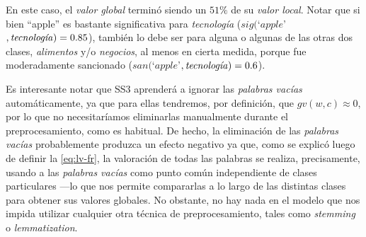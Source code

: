 \begin{itemize}
{        \vspace{5mm}

        En este caso, el \emph{valor global} terminó siendo un $51\%$ de su \emph{valor local}.
        Notar que si bien ``apple'' es bastante significativa para \emph{tecnología} ($sig($`$apple$'$, \text{\emph{tecnología}})=0.85$), también lo debe ser para alguna o algunas de las otras dos clases, \emph{alimentos} y/o \emph{negocios}, al menos en cierta medida, porque fue moderadamente sancionado ($san($`$apple$'$, \text{\emph{tecnología}})=0.6$).
    }
\end{itemize}

Es interesante notar que SS3 aprenderá a ignorar las \emph{palabras vacías} automáticamente, ya que para ellas tendremos, por definición, que $gv(w, c)\approx0$, por lo que no necesitaríamos eliminarlas manualmente durante el preprocesamiento, como es habitual.
De hecho, la eliminación de las \emph{palabras vacías} probablemente produzca un efecto negativo ya que, como se explicó luego de definir la \autoref{eq:lv-fr}, la valoración de todas las palabras se realiza, precisamente, usando a las \emph{palabras vacías} como punto común independiente de clases particulares ---lo que nos permite compararlas a lo largo de las distintas clases para obtener sus valores globales.
No obstante, no hay nada en el modelo que nos impida utilizar cualquier otra técnica de preprocesamiento, tales como \emph{stemming} o \emph{lemmatization}.

